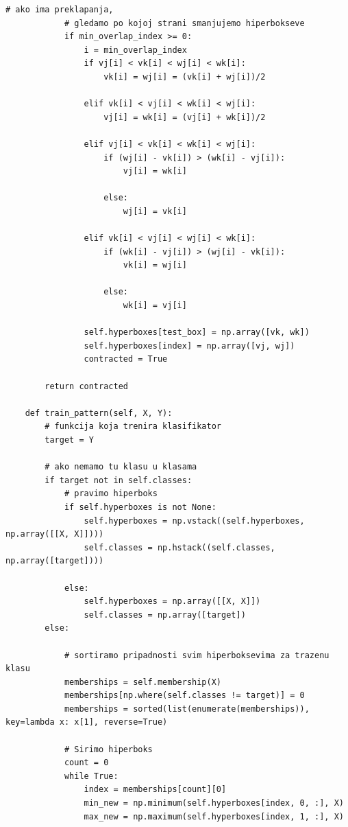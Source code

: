 \documentclass[a4paper]{article}
\begin{document}
\begin{lstlisting}[caption={Klasa koja predstavlja Fazi Min Max klasifikator koji koristi KNN},frame=single, label=particle]
            # ako ima preklapanja, 
            # gledamo po kojoj strani smanjujemo hiperbokseve
            if min_overlap_index >= 0:
                i = min_overlap_index
                if vj[i] < vk[i] < wj[i] < wk[i]:
                    vk[i] = wj[i] = (vk[i] + wj[i])/2

                elif vk[i] < vj[i] < wk[i] < wj[i]:
                    vj[i] = wk[i] = (vj[i] + wk[i])/2

                elif vj[i] < vk[i] < wk[i] < wj[i]:
                    if (wj[i] - vk[i]) > (wk[i] - vj[i]):
                        vj[i] = wk[i]

                    else:
                        wj[i] = vk[i]

                elif vk[i] < vj[i] < wj[i] < wk[i]:
                    if (wk[i] - vj[i]) > (wj[i] - vk[i]):
                        vk[i] = wj[i]

                    else:
                        wk[i] = vj[i]

                self.hyperboxes[test_box] = np.array([vk, wk])
                self.hyperboxes[index] = np.array([vj, wj])
                contracted = True
                
        return contracted
    
    def train_pattern(self, X, Y):
        # funkcija koja trenira klasifikator
        target = Y
        
        # ako nemamo tu klasu u klasama
        if target not in self.classes:
            # pravimo hiperboks
            if self.hyperboxes is not None:
                self.hyperboxes = np.vstack((self.hyperboxes, np.array([[X, X]])))
                self.classes = np.hstack((self.classes, np.array([target])))
       
            else:
                self.hyperboxes = np.array([[X, X]])
                self.classes = np.array([target])
        else:

            # sortiramo pripadnosti svim hiperboksevima za trazenu klasu
            memberships = self.membership(X)
            memberships[np.where(self.classes != target)] = 0
            memberships = sorted(list(enumerate(memberships)), key=lambda x: x[1], reverse=True)
            
            # Sirimo hiperboks
            count = 0
            while True:
                index = memberships[count][0]
                min_new = np.minimum(self.hyperboxes[index, 0, :], X)
                max_new = np.maximum(self.hyperboxes[index, 1, :], X)
                

\end{lstlisting}
\end{document}
